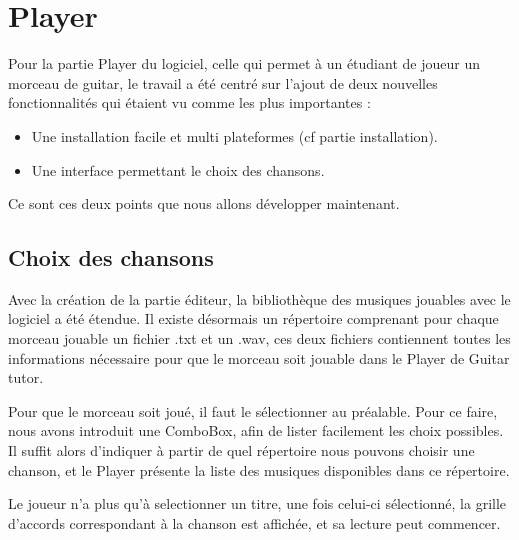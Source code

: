 \chapter{Player}

\indent Pour la partie Player du logiciel, celle qui permet à un étudiant de joueur un morceau de guitar, le travail a été centré sur l'ajout de deux nouvelles fonctionnalités
qui étaient vu comme les plus importantes :\\
\begin{itemize}
\item Une installation facile et multi plateformes (cf partie installation).
\item Une interface permettant le choix des chansons.\\
\end{itemize}
\indent Ce sont ces deux points que nous allons développer maintenant.\\

\section{Choix des chansons}
\indent Avec la création de la partie éditeur, la bibliothèque des musiques jouables avec le logiciel a été étendue.
Il existe désormais un répertoire comprenant pour chaque morceau jouable un fichier .txt et un .wav, ces deux fichiers contiennent toutes les informations nécessaire pour que le morceau soit jouable dans le Player de Guitar tutor. 

\indent Pour que le morceau soit joué, il faut le sélectionner au préalable. Pour ce faire, nous avons introduit une ComboBox, afin de lister facilement les choix possibles. 
Il suffit alors d'indiquer à partir de quel répertoire nous pouvons choisir une chanson, et le Player présente la liste des musiques disponibles dans ce répertoire. 

\indent Le joueur n'a plus qu'à selectionner un titre, une fois celui-ci sélectionné, la grille d'accords correspondant à la chanson est affichée, et sa lecture peut commencer.


